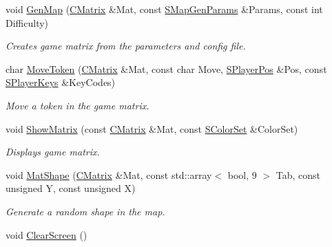 \begin{DoxyCompactItemize}
\item 
void \hyperlink{namespace_chase_game_a15617c8a111cd66bf5d24fd1e82a119d}{Gen\-Map} (\hyperlink{namespace_chase_game_a469449f9237e59efce3982127366c550}{C\-Matrix} \&Mat, const \hyperlink{struct_chase_game_1_1_s_map_gen_params}{S\-Map\-Gen\-Params} \&Params, const int Difficulty)
\begin{DoxyCompactList}\small\item\em Creates game matrix from the parameters and config file. \end{DoxyCompactList}\item 
char \hyperlink{namespace_chase_game_a1dfe4bdbd50ee18cf85760219ea90b03}{Move\-Token} (\hyperlink{namespace_chase_game_a469449f9237e59efce3982127366c550}{C\-Matrix} \&Mat, const char Move, \hyperlink{struct_chase_game_1_1_s_player_pos}{S\-Player\-Pos} \&Pos, const \hyperlink{struct_chase_game_1_1_s_player_keys}{S\-Player\-Keys} \&Key\-Codes)
\begin{DoxyCompactList}\small\item\em Move a token in the game matrix. \end{DoxyCompactList}\item 
void \hyperlink{namespace_chase_game_a871395f1f12e55eaa3d341b8ef2cbb78}{Show\-Matrix} (const \hyperlink{namespace_chase_game_a469449f9237e59efce3982127366c550}{C\-Matrix} \&Mat, const \hyperlink{struct_chase_game_1_1_s_color_set}{S\-Color\-Set} \&Color\-Set)
\begin{DoxyCompactList}\small\item\em Displays game matrix. \end{DoxyCompactList}\item 
void \hyperlink{namespace_chase_game_a049d8d8beb22431889ca7ba34cc90871}{Mat\-Shape} (\hyperlink{namespace_chase_game_a469449f9237e59efce3982127366c550}{C\-Matrix} \&Mat, const std\-::array$<$ bool, 9 $>$ Tab, const unsigned Y, const unsigned X)
\begin{DoxyCompactList}\small\item\em Generate a random shape in the map. \end{DoxyCompactList}\item 
\hypertarget{namespace_chase_game_a3a7382465f6f23fe77cde4e589fb80d6}{void \hyperlink{namespace_chase_game_a3a7382465f6f23fe77cde4e589fb80d6}{Clear\-Screen} ()}\label{namespace_chase_game_a3a7382465f6f23fe77cde4e589fb80d6}


\end{DoxyCompactItemize}
